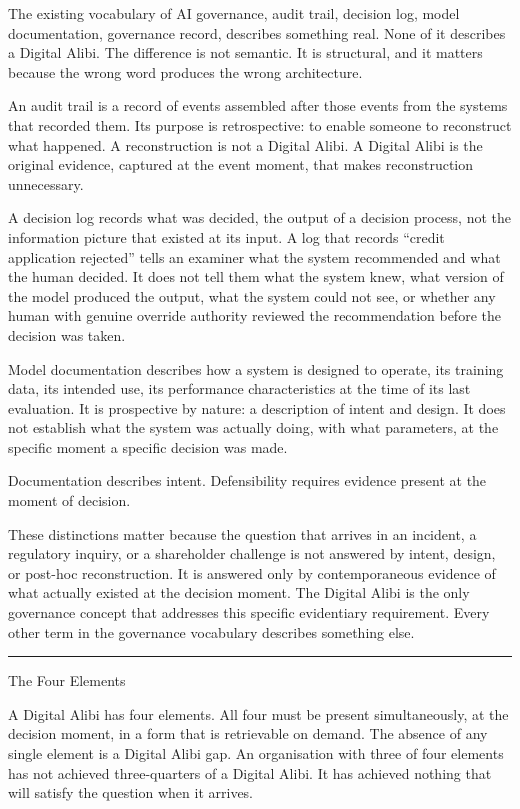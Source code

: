 The existing vocabulary of AI governance, audit trail, decision log, model documentation, governance record, describes something real. None of it describes a Digital Alibi. The difference is not semantic. It is structural, and it matters because the wrong word produces the wrong architecture.

An audit trail is a record of events assembled after those events from the systems that recorded them. Its purpose is retrospective: to enable someone to reconstruct what happened. A reconstruction is not a Digital Alibi. A Digital Alibi is the original evidence, captured at the event moment, that makes reconstruction unnecessary.

A decision log records what was decided, the output of a decision process, not the information picture that existed at its input. A log that records ``credit application rejected'' tells an examiner what the system recommended and what the human decided. It does not tell them what the system knew, what version of the model produced the output, what the system could not see, or whether any human with genuine override authority reviewed the recommendation before the decision was taken.

Model documentation describes how a system is designed to operate, its training data, its intended use, its performance characteristics at the time of its last evaluation. It is prospective by nature: a description of intent and design. It does not establish what the system was actually doing, with what parameters, at the specific moment a specific decision was made.

Documentation describes intent. Defensibility requires evidence present at the moment of decision.

These distinctions matter because the question that arrives in an incident, a regulatory inquiry, or a shareholder challenge is not answered by intent, design, or post-hoc reconstruction. It is answered only by contemporaneous evidence of what actually existed at the decision moment. The Digital Alibi is the only governance concept that addresses this specific evidentiary requirement. Every other term in the governance vocabulary describes something else.

\begin{center}\rule{0.5\linewidth}{0.5pt}\end{center}

The Four Elements

A Digital Alibi has four elements. All four must be present simultaneously, at the decision moment, in a form that is retrievable on demand. The absence of any single element is a Digital Alibi gap. An organisation with three of four elements has not achieved three-quarters of a Digital Alibi. It has achieved nothing that will satisfy the question when it arrives.

